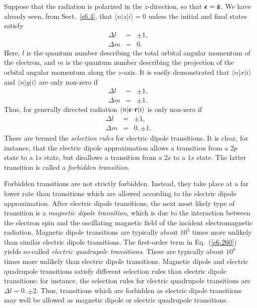 Suppose that the radiation is polarized in the $z$-direction, 
so that $\mbox{\boldmath$\epsilon$}
= \hat{\bf z}$. We have already seen, from Sect.~\ref{s6.4}, that 
$\langle n|z|i\rangle=0$ unless the initial and final states satisfy
\begin{eqnarray}
\Delta l &=& \pm 1,\\[0.5ex]
\Delta m &=& 0.
\end{eqnarray}
Here, $l$ is the quantum number describing the total orbital angular momentum of
the electron, and $m$ is the quantum number describing the projection of the
orbital angular momentum along the $z$-axis.
It is easily demonstrated that $\langle n|x|i \rangle $ and 
$\langle n|y|i\rangle $
are only non-zero if 
\begin{eqnarray}
\Delta l &=& \pm 1,\\[0.5ex]
\Delta m &=& \pm 1.
\end{eqnarray}
Thus, for generally directed radiation $\langle n|\mbox{\boldmath$\epsilon$}
\!\cdot\!{\bf r}|i\rangle$ is only non-zero if
\begin{eqnarray}
\Delta l &=& \pm 1,\\[0.5ex]
\Delta m &=& 0, \pm 1.
\end{eqnarray}
These are termed the {\em selection rules} for electric dipole transitions. It
is clear, for instance, that the electric dipole approximation allows
a transition from a $2p$ state to a $1s$ state, but disallows a transition
from a $2s$ to a $1s$ state. The latter transition is called a {\em forbidden
transition}. 

Forbidden transitions are not strictly forbidden. Instead, they  take
place at a far lower rate than transitions which are allowed 
according to  the electric
dipole approximation. 
After electric dipole transitions, the next most likely type of transition
is a {\em magnetic dipole transition}, which is due to the interaction between
the electron spin and the oscillating magnetic field of the
incident  electromagnetic
radiation. Magnetic dipole transitions are typically about $10^5$ times
more unlikely than similar electric dipole transitions. The first-order term
in Eq.~(\ref{e6.260}) yields so-called {\em electric quadrupole transitions}.
These are typically about $10^8$ times more unlikely than electric
dipole transitions. Magnetic dipole and electric quadrupole transitions
satisfy different selection rules than  electric dipole transitions:
for instance, the selection rules for electric quadrupole transitions
are $\Delta l =0, \pm 2$. Thus, transitions which are forbidden as
electric dipole transitions may well be allowed as magnetic dipole
or electric quadrupole transitions.

